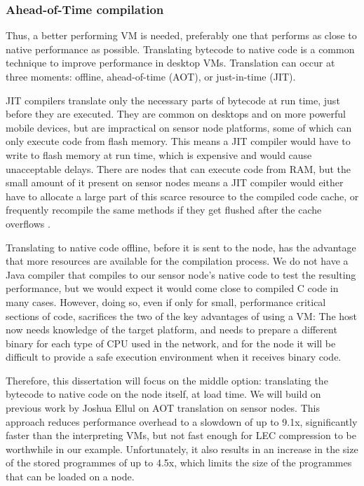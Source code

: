 \subsubsection{Ahead-of-Time compilation}
Thus, a better performing VM is needed, preferably one that performs as close to native performance as possible. Translating bytecode to native code is a common technique to improve performance in desktop VMs. Translation can occur at three moments: offline, ahead-of-time (AOT), or just-in-time (JIT).

JIT compilers translate only the necessary parts of bytecode at run time, just before they are executed. They are common on desktops and on more powerful mobile devices, but are impractical on sensor node platforms, some of which can only execute code from flash memory. This means a JIT compiler would have to write to flash memory at run time, which is expensive and would cause unacceptable delays. There are nodes that can execute code from RAM, but the small amount of it present on sensor nodes means a JIT compiler would either have to allocate a large part of this scarce resource to the compiled code cache, or frequently recompile the same methods if they get flushed after the cache overflows \cite{Ellul:2012thesis}.

Translating to native code offline, before it is sent to the node, has the advantage that more resources are available for the compilation process. We do not have a Java compiler that compiles to our sensor node's native code to test the resulting performance, but we would expect it would come close to compiled C code in many cases. However, doing so, even if only for small, performance critical sections of code, sacrifices the two of the key advantages of using a VM: The host now needs knowledge of the target platform, and needs to prepare a different binary for each type of CPU used in the network, and for the node it will be difficult to provide a safe execution environment when it receives binary code.

Therefore, this dissertation will focus on the middle option: translating the bytecode to native code on the node itself, at load time. We will build on previous work by Joshua Ellul \cite{Ellul:2012thesis} on AOT translation on sensor nodes. This approach reduces performance overhead to a slowdown of up to 9.1x, significantly faster than the interpreting VMs, but not fast enough for LEC compression to be worthwhile in our example. Unfortunately, it also results in an increase in the size of the stored programmes of up to 4.5x, which limits the size of the programmes that can be loaded on a node.

